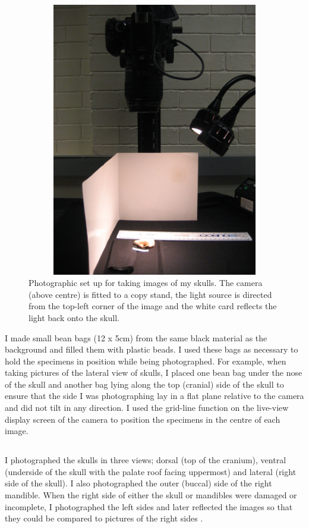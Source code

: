 \begin{figure}[h] 
  \centering
  \includegraphics[width=12cm, height=12cm, keepaspectratio=true]{Methods/figures/camera.jpg}
    \caption[Photographic set up]%
    {Photographic set up for taking images of my skulls. The camera (above centre) is fitted to a copy stand, the light source is directed from the top-left corner of the image and the white card reflects the light back onto the skull. }%
  \label{fig:camera}
  \end{figure}
I made small bean bags (12 x 5cm) from the same black material as the background and filled them with plastic beads. I used these bags as necessary to hold the specimens in position while being photographed. For example, when taking pictures of the lateral view of skulls, I placed one bean bag under the nose of the skull and another bag lying along the top (cranial) side of the skull to ensure that the side I was photographing lay in a flat plane relative to the camera and did not tilt in any direction. 
I used the grid-line function on the live-view display screen of the camera to position the specimens in the centre of each image. 

\subsection{}
I photographed the skulls in three views; dorsal (top of the cranium), ventral (underside of the skull with the palate roof facing uppermost) and lateral (right side of the skull). I also photographed the outer (buccal) side of the right mandible. When the right side of either the skull or mandibles were damaged or incomplete, I photographed the left sides and later reflected the images so that they could be compared to pictures of the right sides \citep[e.g.][]{Barrow2008}.

